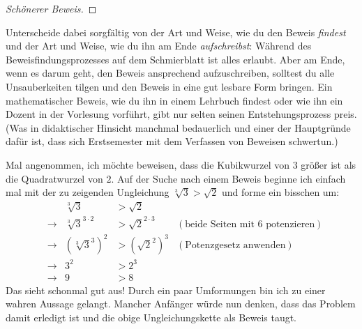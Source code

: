 \begin{bem}[„Gleichungs-U's“]
\begin{proof}[Schönerer Beweis]
    \end{proof}
    Unterscheide dabei sorgfältig von der Art und Weise, wie du den Beweis \emph{findest} und der Art und Weise, wie du ihn am Ende \emph{aufschreibst}: Während des Beweisfindungsprozesses auf dem Schmierblatt ist alles erlaubt. Aber am Ende, wenn es darum geht, den Beweis ansprechend aufzuschreiben, solltest du alle Unsauberkeiten tilgen und den Beweis in eine gut lesbare Form bringen. Ein mathematischer Beweis, wie du ihn in einem Lehrbuch findest oder wie ihn ein Dozent in der Vorlesung vorführt, gibt nur selten seinen Entstehungsprozess preis. (Was in didaktischer Hinsicht manchmal bedauerlich und einer der Hauptgründe dafür ist, dass sich Erstsemester mit dem Verfassen von Beweisen schwertun.)
\end{bem}


\begin{bem} \label{hintennachvorne}
    Mal angenommen, ich möchte beweisen, dass die Kubikwurzel von $3$ größer ist als die Quadratwurzel von $2$. Auf der Suche nach einem Beweis beginne ich einfach mal mit der zu zeigenden Ungleichung $\sqrt[3]{3}>\sqrt{2}$ und forme ein bisschen um:
    \begin{align*}
        && \sqrt[3]{3}& >\sqrt{2} \\
        & \to& \sqrt[3]{3}^{3\cdot 2} & > \sqrt{2}^{2\cdot 3} & (\text{beide Seiten mit $6$ potenzieren}) \\
        & \to & (\sqrt[3]{3}^3)^2 & > (\sqrt{2}^2)^3 & (\text{Potenzgesetz anwenden})\\
        & \to & 3^2 & > 2^3 \\
        & \to & 9 & > 8
    \end{align*}
    Das sieht schonmal gut aus! Durch ein paar Umformungen bin ich zu einer wahren Aussage gelangt. Mancher Anfänger würde nun denken, dass das Problem damit erledigt ist und die obige Ungleichungskette als Beweis taugt.
    

\end{bem}
